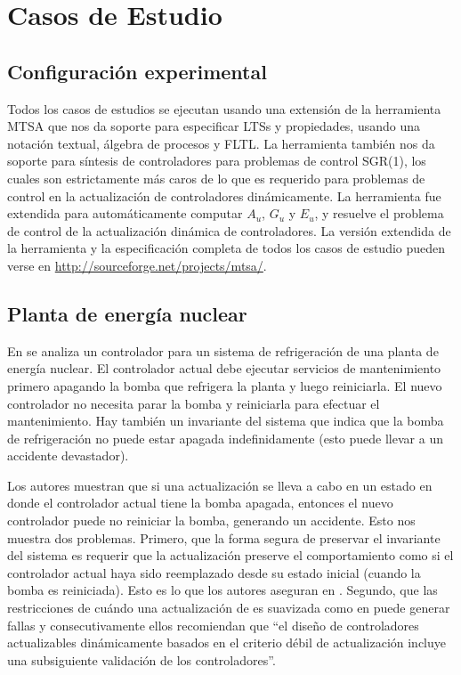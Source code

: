 \section{Casos de Estudio}
\label{cases_of_study}

\subsection*{Configuración experimental}

Todos los casos de estudios se ejecutan usando una extensión de la herramienta MTSA \cite{4639371} que nos da soporte
para especificar LTSs y propiedades, usando una notación textual, álgebra de procesos y FLTL. La herramienta también nos 
da soporte para síntesis de controladores para problemas de control SGR(1), los cuales son estrictamente más caros de lo
que es requerido para problemas de control en la actualización de controladores dinámicamente. La herramienta fue 
extendida para automáticamente computar $A_u$, $G_u$ y $E_u$, y resuelve el problema de control de la actualización
dinámica de controladores. La versión extendida de la herramienta y la especificación completa de todos los casos de
estudio pueden verse en \url{http://sourceforge.net/projects/mtsa/}.

\subsection{Planta de energía nuclear}
\label{power_plant}

En \cite{PanzicaLaManna:2013:FCC:2487336.2487349} se analiza un controlador para un sistema de refrigeración de una
planta de energía nuclear. El controlador actual debe ejecutar servicios de mantenimiento primero apagando la
bomba que refrigera la planta y luego reiniciarla. El nuevo controlador no necesita parar la bomba y reiniciarla para
efectuar el mantenimiento. Hay también un invariante del sistema que indica que la bomba de refrigeración no puede estar
apagada indefinidamente (esto puede llevar a un accidente devastador). 

Los autores muestran que si una actualización se lleva a cabo en un estado en donde el controlador actual tiene la bomba
apagada, entonces el nuevo controlador puede no reiniciar la bomba, generando un accidente. Esto nos muestra dos
problemas. Primero, que la forma segura de preservar el invariante del sistema es requerir que la actualización preserve
el comportamiento como si el controlador actual haya sido reemplazado desde su estado inicial (cuando la bomba es
reiniciada). Esto es lo que los autores aseguran en \cite{6224401}. Segundo, que las restricciones de cuándo una
actualización de \cite{6224401} es suavizada como en \cite{PanzicaLaManna:2013:FCC:2487336.2487349}  puede generar
fallas y consecutivamente ellos recomiendan que ``el diseño de controladores actualizables dinámicamente basados en el
criterio débil de  actualización incluye una subsiguiente validación de los controladores''.

